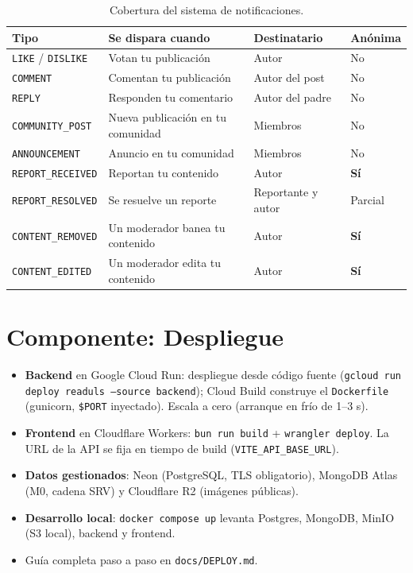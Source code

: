 \documentclass{article}
\begin{document}
\begin{table}[H]
\setlength{\tabcolsep}{0.4em}
{\renewcommand{\arraystretch}{1.22}
\footnotesize
\begin{tabular}{|p{3.9cm}|p{6cm}|p{2.6cm}|p{1.6cm}|}
    \hline
    \rowcolor{tablebackground}
    \color{white}\textbf{Tipo} & \color{white}\textbf{Se dispara cuando} & \color{white}\textbf{Destinatario} & \color{white}\textbf{Anónima} \\
    \hline
    \texttt{LIKE} / \texttt{DISLIKE} & Votan tu publicación & Autor & No \\
    \hline
    \texttt{COMMENT} & Comentan tu publicación & Autor del post & No \\
    \hline
    \texttt{REPLY} & Responden tu comentario & Autor del padre & No \\
    \hline
    \texttt{COMMUNITY\_POST} & Nueva publicación en tu comunidad & Miembros & No \\
    \hline
    \texttt{ANNOUNCEMENT} & Anuncio en tu comunidad & Miembros & No \\
    \hline
    \texttt{REPORT\_RECEIVED} & Reportan tu contenido & Autor & \textbf{Sí} \\
    \hline
    \texttt{REPORT\_RESOLVED} & Se resuelve un reporte & Reportante y autor & Parcial \\
    \hline
    \texttt{CONTENT\_REMOVED} & Un moderador banea tu contenido & Autor & \textbf{Sí} \\
    \hline
    \texttt{CONTENT\_EDITED} & Un moderador edita tu contenido & Autor & \textbf{Sí} \\
    \hline
\end{tabular}}
\caption{Cobertura del sistema de notificaciones.}
\end{table}

\section{Componente: Despliegue}

\begin{itemize}[itemsep=2pt]
    \item \textbf{Backend} en Google Cloud Run: despliegue desde código fuente
    (\texttt{gcloud run deploy readuls --source backend}); Cloud Build
    construye el \texttt{Dockerfile} (gunicorn, \texttt{\$PORT} inyectado).
    Escala a cero (arranque en frío de 1–3 s).
    \item \textbf{Frontend} en Cloudflare Workers:
    \texttt{bun run build} + \texttt{wrangler deploy}. La URL de la API se
    fija en tiempo de build (\texttt{VITE\_API\_BASE\_URL}).
    \item \textbf{Datos gestionados}: Neon (PostgreSQL, TLS obligatorio),
    MongoDB Atlas (M0, cadena SRV) y Cloudflare R2 (imágenes públicas).
    \item \textbf{Desarrollo local}: \texttt{docker compose up} levanta
    Postgres, MongoDB, MinIO (S3 local), backend y frontend.
    \item Guía completa paso a paso en \texttt{docs/DEPLOY.md}.
\end{itemize}
\end{document}
